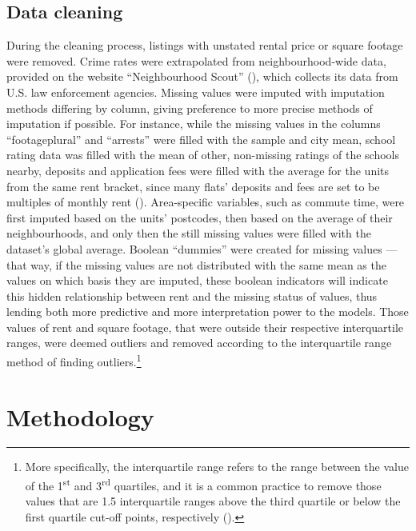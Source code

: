 \documentclass[12pt]{report}
\begin{document}
\subsection{Data cleaning}
During the cleaning process, listings with unstated rental price or square footage were removed. Crime rates were extrapolated from neighbourhood-wide data, provided on the website ``Neighbourhood Scout'' (\cite{NeighbourhoodScoutCrime}), which collects its data from U.S. law enforcement agencies. Missing values were imputed with imputation methods differing by column, giving preference to more precise methods of imputation if possible. For instance, while the missing values in the columns ``footageplural'' and ``arrests'' were filled with the sample and city mean, school rating data was filled with the mean of other, non-missing ratings of the schools nearby, deposits and application fees were filled with the average for the units from the same rent bracket, since many flats' deposits and fees are set to be multiples of monthly rent (\cite{PocketSense}). Area-specific variables, such as commute time, were first imputed based on the units' postcodes, then based on the average of their neighbourhoods, and only then the still missing values were filled with the dataset's global average. Boolean ``dummies'' were created for missing values --- that way, if the missing values are not distributed with the same mean as the values on which basis they are imputed, these boolean indicators will indicate this hidden relationship between rent and the missing status of values, thus lending both more predictive and more interpretation power to the models.
Those values of rent and square footage, that were outside their respective interquartile ranges, were deemed outliers and removed according to the interquartile range method of finding outliers.\footnote{More specifically, the interquartile range refers to the range between the value of the 1\textsuperscript{st} and 3\textsuperscript{rd} quartiles, and it is a common practice to remove those values that are 1.5 interquartile ranges above the third quartile or below the first quartile cut-off points, respectively (\cite{garlits2023}).}

\section{Methodology}
\end{document}
